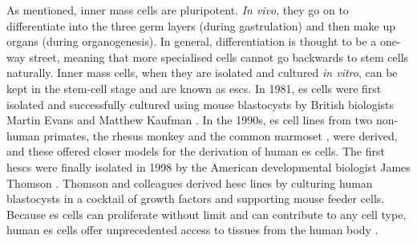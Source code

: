 As mentioned, inner mass cells are pluripotent.
\textit{In vivo}, they go on to differentiate into the three germ layers (during gastrulation) and then make up organs (during organogenesis).
In general, differentiation is thought to be a one-way street, meaning that more specialised cells cannot go backwards to stem cells naturally.
Inner mass cells, when they are isolated and cultured \textit{in vitro}, can be kept in the stem-cell stage and are known as \glspl{esc}.
In 1981, \gls{es} cells were first isolated and successfully cultured using mouse blastocysts by British biologists Martin Evans and Matthew Kaufman \cite{evans1981establishment, martin1981isolation}.
In the 1990s, \gls{es} cell lines from two non-human primates, the rhesus monkey \cite{thomson1995isolation} and the common marmoset \cite{thomson1996pluripotent}, were derived, and these offered closer models for the derivation of human \gls{es} cells. 
The first \glspl{hesc} were finally isolated in 1998 by the American developmental biologist James Thomson \cite{thomson1998embryonic}.
Thomson and colleagues derived \gls{hesc} lines by culturing human blastocysts in a cocktail of growth factors and supporting mouse feeder cells. \\

Because \gls{es} cells can proliferate without limit and can contribute to any cell type, human \gls{es} cells offer unprecedented access to tissues from the human body \cite{department2006regenerative}. 

